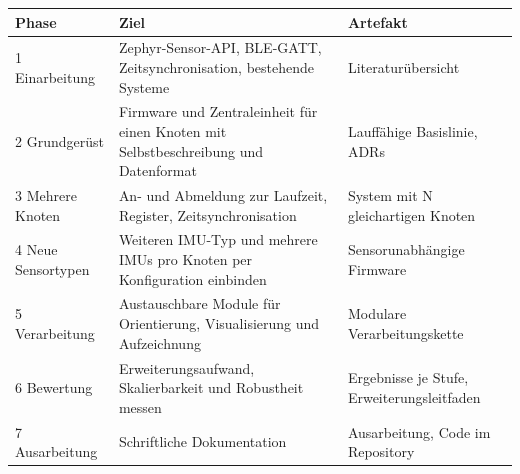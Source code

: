 \documentclass[11pt, a4paper]{article}
\begin{document}
\begin{center}
\small
\begin{tabularx}{\textwidth}{@{}l X X@{}}
\toprule
\textbf{Phase} & \textbf{Ziel} & \textbf{Artefakt} \\
\midrule
1 Einarbeitung & Zephyr-Sensor-API, BLE-GATT, Zeitsynchronisation, bestehende Systeme & Literaturübersicht \\
2 Grundgerüst & Firmware und Zentraleinheit für einen Knoten mit Selbstbeschreibung und Datenformat & Lauffähige Basislinie, ADRs \\
3 Mehrere Knoten & An- und Abmeldung zur Laufzeit, Register, Zeitsynchronisation & System mit N gleichartigen Knoten \\
4 Neue Sensortypen & Weiteren IMU-Typ und mehrere IMUs pro Knoten per Konfiguration einbinden & Sensorunabhängige Firmware \\
5 Verarbeitung & Austauschbare Module für Orientierung, Visualisierung und Aufzeichnung & Modulare Verarbeitungskette \\
6 Bewertung & Erweiterungsaufwand, Skalierbarkeit und Robustheit messen & Ergebnisse je Stufe, Erweiterungsleitfaden \\
7 Ausarbeitung & Schriftliche Dokumentation & Ausarbeitung, Code im Repository \\
\bottomrule
\end{tabularx}
\end{center}

\printbibliography[heading=bibintoc, title={Literaturverzeichnis}]
\end{document}
